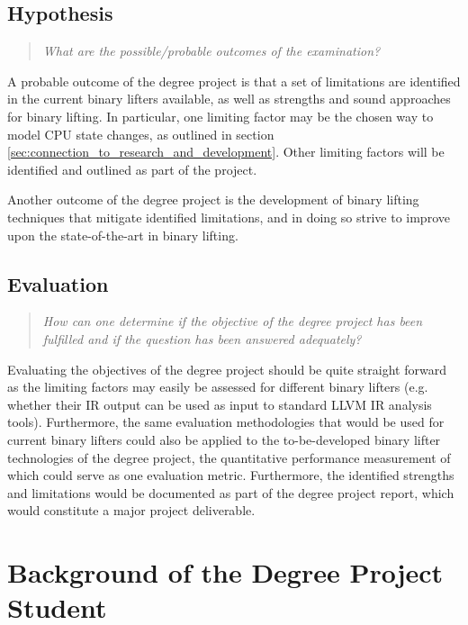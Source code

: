 \documentclass[12pt, a4paper]{article}
\begin{document}
\subsection{Hypothesis}

\begin{quote}
	\textit{What are the possible/probable outcomes of the examination?}
\end{quote}

A probable outcome of the degree project is that a set of limitations are identified in the current binary lifters available, as well as strengths and sound approaches for binary lifting. In particular, one limiting factor may be the chosen way to model CPU state changes, as outlined in section \ref{sec:connection_to_research_and_development}. Other limiting factors will be identified and outlined as part of the project.

Another outcome of the degree project is the development of binary lifting techniques that mitigate identified limitations, and in doing so strive to improve upon the state-of-the-art in binary lifting.

\subsection{Evaluation}

\begin{quote}
	\textit{How can one determine if the objective of the degree project has been fulfilled and if the question has been answered adequately?}
\end{quote}

Evaluating the objectives of the degree project should be quite straight forward as the limiting factors may easily be assessed for different binary lifters (e.g. whether their IR output can be used as input to standard LLVM IR analysis tools). Furthermore, the same evaluation methodologies that would be used for current binary lifters could also be applied to the to-be-developed binary lifter technologies of the degree project, the quantitative performance measurement of which could serve as one evaluation metric. Furthermore, the identified strengths and limitations would be documented as part of the degree project report, which would constitute a major project deliverable.

\section{Background of the Degree Project Student}
\end{document}

